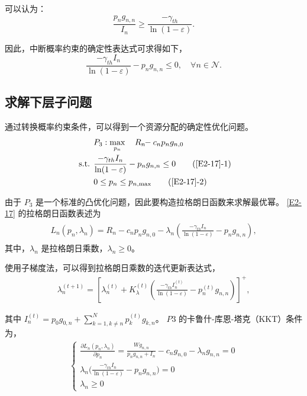 可以认为：
\begin{equation}\label{15}
\frac{p_n g_{ n,n}}{I_{n}}\geq\frac{-\gamma_{th}}{\ln(1-\varepsilon)}.
\end{equation}

因此，中断概率约束的确定性表达式可求得如下，
\begin{equation}\label{16}
\frac{-\gamma_{th} I_{n}}{\ln(1-\varepsilon)}-p_n g_{n,n}\leq0,\quad\forall n\in\mathcal{N}.
\end{equation}
\subsection{求解下层子问题}\label{section2-3-2}
通过转换概率约束条件，可以得到一个资源分配的确定性优化问题。
\begin{align}
&P_3: \max\limits_{p_{n}} \quad R_{n}\!\!-c_{n} p_n g_{n,0}               \label{E2-17}\\
\text { s.t. }
& \frac{-\gamma_{th} I_{n}}{\ln(1-\varepsilon)}-p_n g_{n,n}\leq0          \tag{\ref{E2-17}{-1}}      \label{E2-17-1}\\  %
& 0\leq p_n\leq p_{n,\textrm{max}}                                        \tag{\ref{E2-17}{-2}}      \label{E2-17-2}  %
\end{align}

由于 $P_3$ 是一个标准的凸优化问题，因此要构造拉格朗日函数来求解最优幂。 \eqref{E2-17} 的拉格朗日函数表述为
\begin{eqnarray}\label{18}
\begin{array}{lll}
\textit{L}_n(p_n, \lambda_n)=R_{n}\!\!-\!\!c_{n} p_n g_{n,0}\!\!-\!\!\lambda_n \left(\frac{-\gamma_{th} I_{n}}{\ln(1-\varepsilon)}-p_n g_{n,n}\right),
\end{array}
\end{eqnarray}
其中，$\lambda_n$ 是拉格朗日乘数，$\lambda_n \geq 0$。

使用子梯度法，可以得到拉格朗日乘数的迭代更新表达式，
\begin{equation}\label{19}
\begin{array}{lll}
     \lambda_n^{(t+1)}=[\lambda_n^{(t)}\!\!+\!K_{\lambda}^{(t)}(\frac{-\gamma_{th} I_{n}^{(t)}}{\ln(1-\varepsilon)}-p_n^{(t)} g_{n,n})]^+,
\end{array}
\end{equation}

其中 $I_{n}^{(t)}=$$p_0 g_{0,n}+\sum_{k=1,k\neq n}^N p_k^{(t)} g_{k,n}$。
$P3$ 的卡鲁什-库恩-塔克（KKT）条件为，
\begin{equation}\label{20}
\begin{array}{rl}
\left\{
\begin{array}{lll}
     \frac{\partial \textit{L}_n(p_n, \lambda_n)}{\partial p_n}\!=\!\frac{W g_{n,n}}{p_n g_{n,n}+I_n}\!-\!c_n g_{n,0}\!-\!\lambda_n g_{n,n}\!=\!0\\
     \lambda_n \big(\frac{-\gamma_{th} I_{n}}{\ln(1-\varepsilon)}-p_n g_{n,n}\big)=0\\
     \lambda_n \geq 0
\end{array}
\right.
\end{array}
\end{equation}

